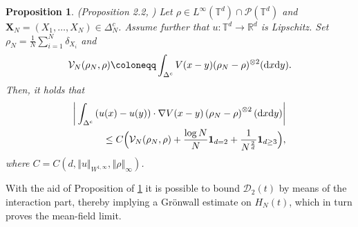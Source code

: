 \documentclass[11pt,reqno]{amsart}
\newtheorem{prop}[thm]{Proposition}
\numberwithin{equation}{section}
\def\dd{{\rm d}}
\begin{document}
\begin{prop}\label{Commutator estimates} \textup{(Proposition 2.2, \cite{duerinckx2020mean})} \label{commutator estimate} 
Let $\rho\in L^{\infty}(\mathbb{T}^{d})\cap \mathcal{P}(\mathbb{T}^{d})$ and  $\mathbf{X}_{N}=(X_{1},\dots,X_{N})\in \Delta_{N}^{c}$.  Assume further that $u:\mathbb{T}^{d}\rightarrow \mathbb{R}^{d}$ is Lipschitz. Set $\rho_{N}=\frac{1}{N}\sum_{i=1}^{N}\delta_{X_{i}}$ and 
\begin{align}
\mathcal{V}_{N}(\rho_{N},\rho)\coloneqq\int_{\Delta^{c}} V(x-y)(\rho_{N}-\rho)^{\otimes 2}(\dd x\dd y). \label{def of VN}   
\end{align}
Then,
it holds that
 \begin{align*}
\bigg\vert \int_{\Delta^{c}
}\left(u(x)-u(y)\right) \cdot\nabla V(x-y)\left(\rho_{N}-\rho\right)^{\otimes2}(\dd x\dd y)\bigg\vert \\
\leq C\Big(\mathcal{V}_{N}(\rho_{N},\rho)+\frac{\log N}{N}\mathbf{1}_{d=2}+\frac{1}{N^{\frac{2}{d}}}\mathbf{1}_{d\geq3}\Big),
\end{align*}
where $C=C\left(d,\left\Vert u \right\Vert_{W^{1,\infty}},\left\Vert \rho\right\Vert_{\infty} \right)$. 
\end{prop}
With the aid of Proposition of \ref{Commutator estimates} it is possible to bound $\mathcal{D}_{2}(t)$ by means of the interaction part, thereby implying a Gr\"onwall estimate on $H_{N}(t)$, which in turn proves the mean-field limit.  
\end{document}

